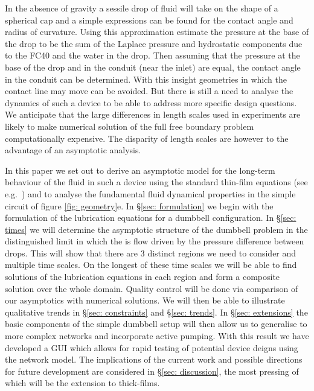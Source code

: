 \documentclass{jfm}
\begin{document}
In the absence of gravity a sessile  drop of fluid will  take on the shape of a spherical cap and a simple expressions can be found for the contact angle and radius of curvature. 
Using this approximation  \cite{Walsh2017MicrofluidicsWalls}  estimate the pressure at the base of the drop to be the sum of the Laplace pressure and    hydrostatic components due to the FC40 and the water in the drop.
Then assuming that the pressure at the base of the drop and     in the   conduit (near the inlet) are equal, the   contact angle in   the  conduit can  be determined.
With this insight geometries in which the contact line may  move  can be avoided.
But there is still a need  to analyse the dynamics of such a device to be able to address more specific design questions.
We  anticipate that the large differences in length scales used in experiments are likely to make numerical solution of  the full  free boundary problem computationally expensive. 
The disparity of length scales are however to the advantage of an asymptotic analysis.


In this paper we set out to derive an asymptotic  model   for the long-term behaviour of the fluid  in such a device using the standard thin-film equations (see e.g.~\cite{Oron1997Long-scaleFilms}) and to analyse the fundamental fluid dynamical properties in the simple circuit of figure \ref{fig: geometry}e.
In \S \ref{sec: formulation} we begin with the formulation of the  lubrication equations for a dumbbell configuration.
In \S \ref{sec: times} we will determine the asymptotic structure of the dumbbell  problem in the  distinguished limit in which  the is flow driven by the  pressure difference between drops.
This will show that there are 3 distinct regions we need to consider and multiple time scales.
On  the longest of these time scales we will be able to find solutions of the lubrication equations in each region and form a composite solution over  the whole domain.
Quality control will be done via comparison of our asymptotics  with numerical solutions.
We will then be able to  illustrate qualitative trends in \S \ref{sec: constraints} and \S \ref{sec: trends}.
In \S \ref{sec: extensions}  the basic components of the simple dumbbell setup  will then allow us to generalise to more complex networks and incorporate active pumping.
With this result we have developed a GUI which allows for rapid testing of potential device deigns using the network model.
The implications of the current work and possible directions for future development  are considered in \S \ref{sec: discussion}, the most pressing of which will be the extension to thick-films.
\end{document}
